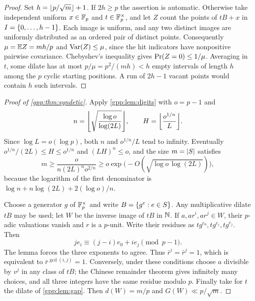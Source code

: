 \begin{proof}
Set $h=\lfloor p/\sqrt m\rfloor+1$. If $2h\ge p$ the assertion is automatic. Otherwise take
independent uniform $x\in\mathbb{F}_p$ and $t\in\mathbb{F}_p^\times$, and let $Z$ count the points of
$tB+x$ in $I=\{0,\ldots,h-1\}$. Each image is uniform, and any two distinct images are
uniformly distributed as an ordered pair of distinct points. Consequently
$\mu=\mathbb{E} Z=mh/p$ and $\operatorname{Var}(Z)\le\mu$, since the hit indicators have nonpositive
pairwise covariance. Chebyshev's inequality gives $\operatorname{Pr}(Z=0)\le1/\mu$. Averaging in
$t$, some dilate has at most $p/\mu=p^2/(mh)<h$ empty intervals of length $h$ among the
$p$ cyclic starting positions. A run of $2h-1$ vacant points would contain $h$ such
intervals.
\end{proof}

\begin{proof}[Proof of \cref{gpp:thm:syndetic}]
Apply \cref{gpp:lem:digits} with $o=p-1$ and
\[
 n=\floor*{\sqrt{\frac{\log o}{\log(2L)}}},\qquad H=\floor*{\frac{o^{1/n}}{L}} .
\]
Since $\log L=o(\log p)$, both $n$ and $o^{1/n}/L$ tend to infinity. Eventually
$o^{1/n}/(2L)\le H\le o^{1/n}$ and $(LH)^n\le o$, and the size $m=\lvert S\rvert$ satisfies
\[
 m\ge\frac{o}{n(2L)^no^{2/n}}\ge o\exp\bigl(-O(\sqrt{\log o\,\log(2L)})\bigr),
\]
because the logarithm of the first denominator is $\log n+n\log(2L)+2(\log o)/n$.

Choose a generator $g$ of $\mathbb{F}_p^\times$ and write $B=\{g^e:e\in S\}$. Any
multiplicative dilate $tB$ may be used; let $W$ be the inverse image of $tB$ in $\mathbb{N}$. If
$a,ar^i,ar^j\in W$, their $p$-adic valuations vanish and $r$ is a $p$-unit. Write their
residues as $tg^{e_0},tg^{e_i},tg^{e_j}$. Then
\[
 je_i\equiv(j-i)e_0+ie_j\pmod{p-1}.
\]
The lemma forces the three exponents to agree. Thus $\bar r^i=\bar r^j=1$, which is
equivalent to $\bar r^{\gcd(i,j)}=1$. Conversely, under these conditions choose $a$
divisible by $v^j$ in any class of $tB$; the Chinese remainder theorem gives infinitely
many choices, and all three integers have the same residue modulo $p$. Finally take for
$t$ the dilate of \cref{gpp:lem:gap}. Then $d(W)=m/p$ and $G(W)\ll p/\sqrt m$.
\end{proof}


